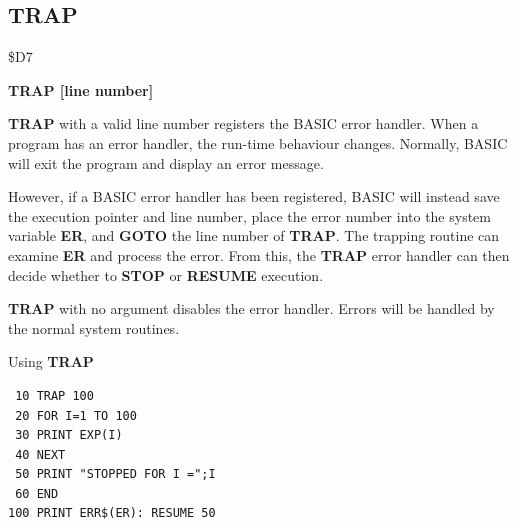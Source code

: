 \subsection{TRAP}
\begin{description}[leftmargin=2cm,style=nextline]
\item [Token:] \$D7
\item [Format:] {\bf TRAP [line number]}
\item [Usage:]  {\bf TRAP} with a valid line number registers the
                BASIC error handler. When a program has an error handler, the
                run-time behaviour changes. Normally, BASIC will exit the program
                and display an error message.

                However, if a BASIC error handler has been registered, BASIC will
                instead save the execution pointer and line number, place the
                error number into the system variable {\bf ER}, and {\bf GOTO}
                the line number of {\bf TRAP}. The trapping routine can examine
                {\bf ER} and process the error. From this, the {\bf TRAP} error
                handler can then decide whether to {\bf STOP} or {\bf RESUME} execution.

                {\bf TRAP} with no argument disables the error handler.
                Errors will be handled by the normal system routines.

\item [Example:] Using {\bf TRAP}
\begin{tcolorbox}[colback=black,coltext=white]
\verbatimfont{\codefont}
\begin{verbatim}
 10 TRAP 100
 20 FOR I=1 TO 100
 30 PRINT EXP(I)
 40 NEXT
 50 PRINT "STOPPED FOR I =";I
 60 END
100 PRINT ERR$(ER): RESUME 50
\end{verbatim}
\end{tcolorbox}
\end{description}


\newpage

